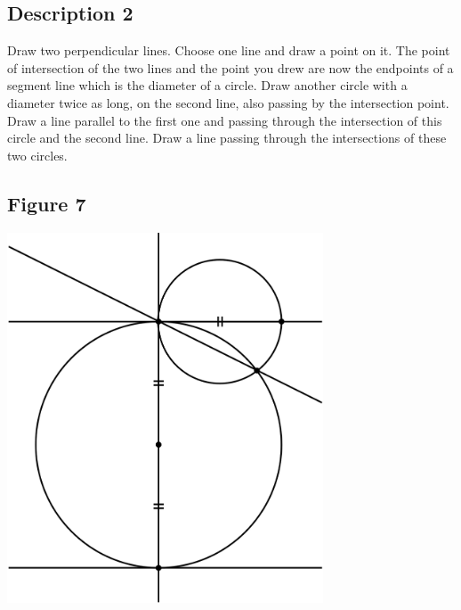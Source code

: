 \documentclass[12pt,a4paper,article,english,firamath]{nsi}
\begin{document}
\maketitle
\subsection*{Description 2}
{\brettley
Draw two perpendicular lines. Choose one line and draw a point on it. The point of intersection of the two lines and the point you drew are now the endpoints of a segment line which is the diameter of a circle. Draw another circle with a diameter twice as long, on the second line, also passing by the intersection point. Draw a line parallel to the first one and passing through the intersection of this circle and the second line. Draw a line passing through the intersections of these two circles.}\\[1em]




\subsection*{Figure 7}
\begin{center}
    \includegraphics[height=11cm]{img/fig02.png}
\end{center}
\end{document}
